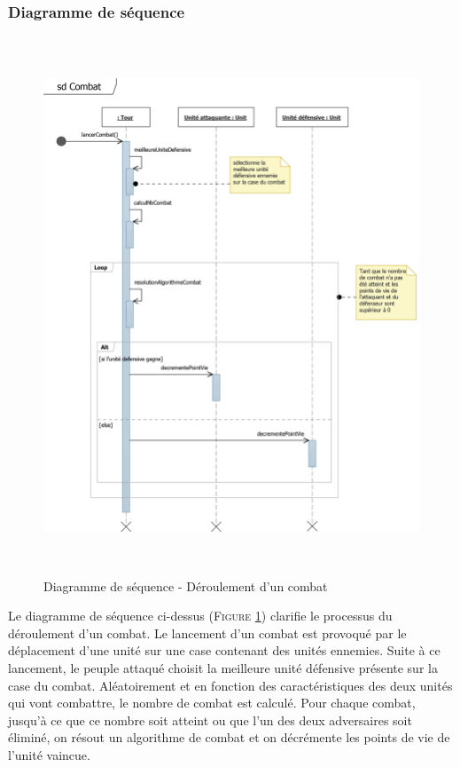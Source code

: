 \documentclass[a4paper,11pt]{article}
\begin{document}
		\subsubsection{Diagramme de séquence}
			\begin{figure}[ht!]
				\includegraphics[height=16cm]{Diagrammes/Combat/seqCombat.png}
				\caption{Diagramme de séquence - Déroulement d'un combat}
				\label{fig:seqcombat}
			\end{figure}
			\vspace*{1cm}
			Le diagramme de séquence ci-dessus (\textsc{Figure \ref{fig:seqcombat}}) clarifie le processus du déroulement d'un combat. Le lancement d'un combat est provoqué par le déplacement d'une unité sur une case contenant des unités ennemies. Suite à ce lancement, le peuple attaqué choisit la meilleure unité défensive présente sur la case du combat. Aléatoirement et en fonction des caractéristiques des deux unités qui vont combattre, le nombre de combat est calculé. Pour chaque combat, jusqu'à ce que ce nombre soit atteint ou que l'un des deux adversaires soit éliminé, on résout un algorithme de combat et on décrémente les points de vie de l'unité vaincue.
			
\end{document}
